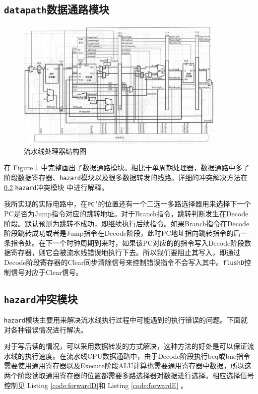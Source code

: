 \documentclass[12pt,a4paper]{article}
\newcommand{\incode}[1]{\texttt{#1}} %
\begin{document}
\subsection{\incode{datapath}数据通路模块}

\begin{figure}[htbp]
	\centering
	\includegraphics[width=0.9\textwidth]{datapath}
	\caption{流水线处理器结构图}
	\label{fig:datapath}
\end{figure}

在 Figure \ref{fig:datapath} 中完整画出了数据通路模块。相比于单周期处理器，数据通路中多了阶段数据寄存器、\incode{hazard}模块以及很多数据转发的线路。详细的冲突解决方法在 \ref{subsection} \incode{hazard}冲突模块 中进行解释。

我所实现的实际电路中，在\incode{PC'}的位置还有一个二选一多路选择器用来选择下一个PC是否为Jump指令对应的跳转地址。对于Branch指令，跳转判断发生在Decode阶段。默认预测为跳转不成功，即继续执行后续指令。如果Branch指令在Decode阶段跳转成功或者是Jump指令在Decode阶段，此时PC地址指向跳转指令的后一条指令处。在下一个时钟周期到来时，如果该PC对应的的指令写入Decode阶段数据寄存器，则它会被流水线错误地执行下去。所以我们要阻止其写入，即通过Decode阶段寄存器的Clear同步清除信号来控制错误指令不会写入其中。\incode{flushD}控制信号对应于Clear信号。

\subsection{\incode{hazard}冲突模块}\label{subsection}

\incode{hazard}模块主要用来解决流水线执行过程中可能遇到的执行错误的问题。下面就对各种错误情况进行解决。

对于写后读的情况，可以采用数据转发的方式解决，这种方法的好处是可以保证流水线的执行速度。在流水线CPU数据通路中，由于Decode阶段执行beq或bne指令需要使用通用寄存器以及Execute阶段ALU计算也需要通用寄存器中数据，所以这两个阶段读取通用寄存器的位置都需要多路选择器对数据进行选择。相应选择信号控制见 Listing \ref{code:forwardD}和 Listing \ref{code:forwardE} 。
\end{document}
